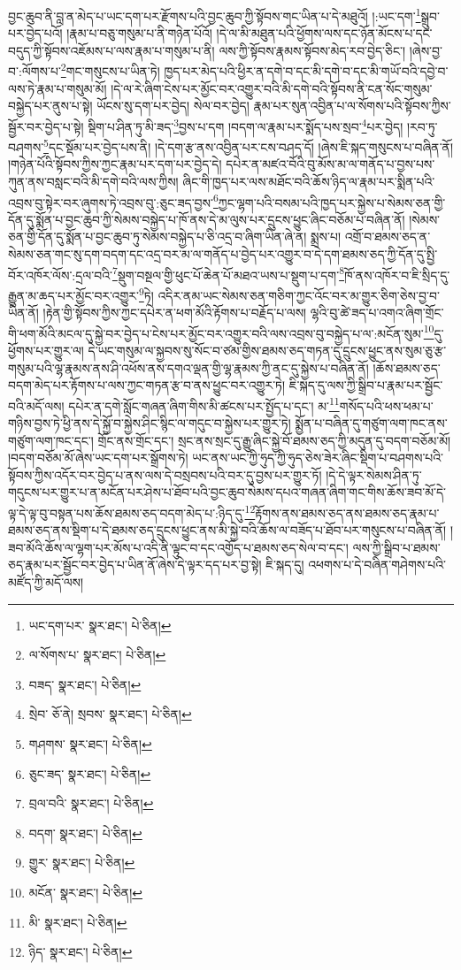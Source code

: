 བྱང་ཆུབ་ནི་བླ་ན་མེད་པ་ཡང་དག་པར་རྫོགས་པའི་བྱང་ཆུབ་ཀྱི་སྟོབས་གང་ཡིན་པ་དེ་མཐུའོ། །:ཡང་དག་\footnote{ཡང་དག་པར་  སྣར་ཐང་།  པེ་ཅིན། }སྒྲུབ་པར་བྱེད་པའོ། །རྣམ་པ་བཅུ་གསུམ་པ་ནི་གཉེན་པོའོ། །དེ་ལ་མི་མཐུན་པའི་ཕྱོགས་ལས་དང་ཉོན་མོངས་པ་དང་བདུད་ཀྱི་སྟོབས་འཇོམས་པ་ལས་རྣམ་པ་གསུམ་པ་ནི། ལས་ཀྱི་སྟོབས་རྣམས་སྟོབས་མེད་རབ་བྱེད་ཅིང་། །ཞེས་བྱ་བ་:ལོགས་པ་\footnote{ལ་སོགས་པ་  སྣར་ཐང་།  པེ་ཅིན། }གང་གསུངས་པ་ཡིན་ཏེ། ཁྱད་པར་མེད་པའི་ཕྱིར་ན་དགེ་བ་དང་མི་དགེ་བ་དང་མི་གཡོ་བའི་དབྱེ་བ་ལས་ཏེ་རྣམ་པ་གསུམ་མོ། །དེ་ལ་རེ་ཞིག་ངེས་པར་མྱོང་བར་འགྱུར་བའི་མི་དགེ་བའི་སྟོབས་ནི་ངན་སོང་གསུམ་བསྐྱེད་པར་ནུས་པ་སྟེ། ཡོངས་སུ་དག་པར་བྱེད། སེལ་བར་བྱེད། རྣམ་པར་སུན་འབྱིན་པ་ལ་སོགས་པའི་སྟོབས་ཀྱིས་སྦྱོར་བར་བྱེད་པ་སྟེ། སྡིག་པ་ཤིན་ཏུ་མི་ཟད་\footnote{བཟད་  སྣར་ཐང་།  པེ་ཅིན། }བྱས་པ་དག །བདག་ལ་རྣམ་པར་སྨོད་པས་སྲབ་\footnote{སྲེབ་  ཅོ་ནེ། སྲབས་  སྣར་ཐང་།  པེ་ཅིན། }པར་བྱེད། །རབ་ཏུ་བཤགས་\footnote{གཤགས་  སྣར་ཐང་།  པེ་ཅིན། }དང་སྡོམ་པར་བྱེད་པས་ནི། །དེ་དག་རྩ་ནས་འབྱིན་པར་ངས་བཤད་དོ། །ཞེས་ཇི་སྐད་གསུངས་པ་བཞིན་ནོ། །གཉེན་པོའི་སྟོབས་ཀྱིས་ཀྱང་རྣམ་པར་དག་པར་བྱེད་དེ། དཔེར་ན་མཛའ་བོའི་བུ་མོས་མ་ལ་གནོད་པ་བྱས་པས་ཀུན་ནས་བསླང་བའི་མི་དགེ་བའི་ལས་ཀྱིས། ཞིང་གི་ཁྱད་པར་ལས་མཐོང་བའི་ཆོས་ཉིད་ལ་རྣམ་པར་སྨིན་པའི་འབྲས་བུ་སྟེར་བར་ཞུགས་ཏེ་འབྲས་བུ་:ཅུང་ཟད་བྱས་\footnote{ཅུང་ཟད་  སྣར་ཐང་།  པེ་ཅིན། }ཀྱང་ལྷག་པའི་བསམ་པའི་ཁྱད་པར་སྐྱེས་པ་སེམས་ཅན་གྱི་དོན་དུ་སྨོན་པ་བྱང་ཆུབ་ཀྱི་སེམས་བསྐྱེད་པ་ཁོ་ནས་དེ་མ་ལུས་པར་དྲུངས་ཕྱུང་ཞིང་བཅོམ་པ་བཞིན་ནོ། །སེམས་ཅན་གྱི་དོན་དུ་སྨོན་པ་བྱང་ཆུབ་ཏུ་སེམས་བསྐྱེད་པ་ཅི་འདྲ་བ་ཞིག་ཡིན་ཞེ་ན། སྨྲས་པ། འགྲོ་བ་ཐམས་ཅད་ན་སེམས་ཅན་གང་སུ་དག་བདག་དང་འདྲ་བར་མ་ལ་གནོད་པ་བྱེད་པར་འགྱུར་བ་དེ་དག་ཐམས་ཅད་ཀྱི་དོན་དུ་སྤྱི་བོར་འཁོར་ལོས་:དྲལ་བའི་\footnote{བྲལ་བའི་  སྣར་ཐང་།  པེ་ཅིན། }སྡུག་བསྔལ་གྱི་ཕུང་པོ་ཆེན་པོ་མཐའ་ཡས་པ་སྡུག་པ་དག་\footnote{བདག་  སྣར་ཐང་།  པེ་ཅིན། }ཁོ་ནས་འཁོར་བ་ཇི་སྲིད་དུ་རྒྱུན་མ་ཆད་པར་མྱོང་བར་འགྱུར་\footnote{གྱུར་  སྣར་ཐང་།  པེ་ཅིན། }ཏེ། འདིར་ནམ་ཡང་སེམས་ཅན་གཅིག་ཀྱང་འོང་བར་མ་གྱུར་ཅིག་ཅེས་བྱ་བ་ཡིན་ནོ། །རྟེན་གྱི་སྟོབས་ཀྱིས་ཀྱང་དཔེར་ན་ཕག་མོའི་རྟོགས་པ་བརྗོད་པ་ལས། ལྷའི་བུ་ཚེ་ཟད་པ་འགའ་ཞིག་གྲོང་གི་ཕག་མོའི་མངལ་དུ་སྐྱེ་བར་བྱེད་པ་ངེས་པར་མྱོང་བར་འགྱུར་བའི་ལས་འབྲས་བུ་བསྐྱེད་པ་ལ་:མངོན་སུམ་\footnote{མངོན་  སྣར་ཐང་།  པེ་ཅིན། }དུ་ཕྱོགས་པར་གྱུར་ལ། དེ་ཡང་གསུམ་ལ་སྐྱབས་སུ་སོང་བ་ཙམ་གྱིས་ཐམས་ཅད་གཏན་དུ་དྲུངས་ཕྱུང་ནས་སུམ་ཅུ་རྩ་གསུམ་པའི་ལྷ་རྣམས་ནས་ཤི་འཕོས་ནས་དགའ་ལྡན་གྱི་ལྷ་རྣམས་ཀྱི་ནང་དུ་སྐྱེས་པ་བཞིན་ནོ། །ཆོས་ཐམས་ཅད་བདག་མེད་པར་རྟོགས་པ་ལས་ཀྱང་གཏན་རྩ་བ་ནས་ཕྱུང་བར་འགྱུར་ཏེ། ཇི་སྐད་དུ་ལས་ཀྱི་སྒྲིབ་པ་རྣམ་པར་སྦྱོང་བའི་མདོ་ལས། དཔེར་ན་དགེ་སློང་གཞན་ཞིག་གིས་མི་ཚངས་པར་སྤྱོད་པ་དང་། མ་\footnote{མི་  སྣར་ཐང་།  པེ་ཅིན། }གསོད་པའི་ཕས་ཕམ་པ་གཉིས་བྱས་ཏེ་ཕྱི་ནས་དེ་སྐྱོ་བ་སྐྱེས་ཤིང་སྙིང་ལ་གདུང་བ་སྐྱེས་པར་གྱུར་ཏེ། སྨྱོན་པ་བཞིན་དུ་གཙུག་ལག་ཁང་ནས་གཙུག་ལག་ཁང་དང་། གྲོང་ནས་གྲོང་དང་། སྲང་ནས་སྲང་དུ་རྒྱུ་ཞིང་སྐྱེ་བོ་ཐམས་ཅད་ཀྱི་མདུན་དུ་བདག་བཅོམ་མོ། །བདག་བཅོམ་མོ་ཞེས་ཡང་དག་པར་སྒྲོགས་ཏེ། ཡང་ནས་ཡང་ཀྱི་ཧུད་ཀྱི་ཧུད་ཅེས་ཟེར་ཞིང་སྡིག་པ་བཤགས་པའི་སྟོབས་ཀྱིས་འདོར་བར་བྱེད་པ་ནས་ལས་དེ་བསྲབས་པའི་བར་དུ་བྱས་པར་གྱུར་ཏོ། །དེ་དེ་ལྟར་སེམས་ཤིན་ཏུ་གདུངས་པར་གྱུར་པ་ན་མངོན་པར་ཤེས་པ་ཐོབ་པའི་བྱང་ཆུབ་སེམས་དཔའ་གཞན་ཞིག་གང་གིས་ཆོས་ཟབ་མོ་དེ་ལྟ་དེ་ལྟ་བུ་བསྟན་པས་ཆོས་ཐམས་ཅད་བདག་མེད་པ་:ཉིད་དུ་\footnote{ཉིད་  སྣར་ཐང་།  པེ་ཅིན། }རྟོགས་ནས་ཐམས་ཅད་ནས་ཐམས་ཅད་རྣམ་པ་ཐམས་ཅད་ནས་སྡིག་པ་དེ་ཐམས་ཅད་དྲུངས་ཕྱུང་ནས་མི་སྐྱེ་བའི་ཆོས་ལ་བཟོད་པ་ཐོབ་པར་གསུངས་པ་བཞིན་ནོ། །ཟབ་མོའི་ཆོས་ལ་ལྷག་པར་མོས་པ་འདི་ནི་ལྟུང་བ་དང་འགྱོད་པ་ཐམས་ཅད་སེལ་བ་དང་། ལས་ཀྱི་སྒྲིབ་པ་ཐམས་ཅད་རྣམ་པར་སྦྱོང་བར་བྱེད་པ་ཡིན་ནོ་ཞེས་དེ་ལྟར་དད་པར་བྱ་སྟེ། ཇི་སྐད་དུ། འཕགས་པ་དེ་བཞིན་གཤེགས་པའི་མཛོད་ཀྱི་མདོ་ལས། 